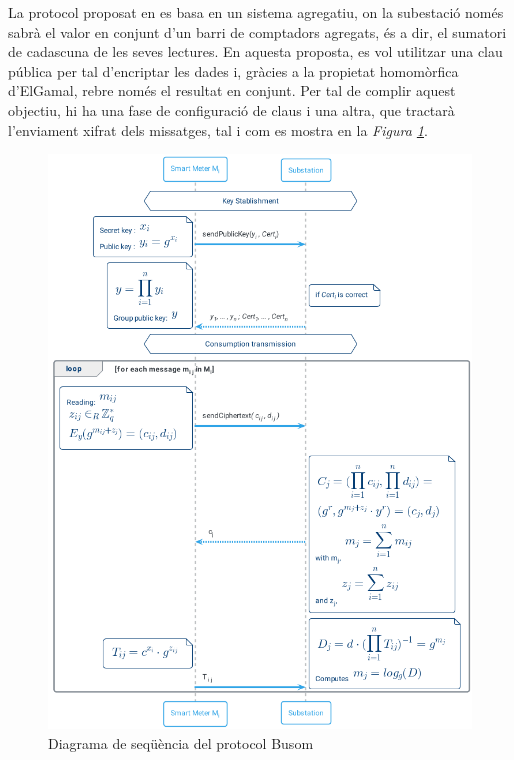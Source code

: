 

La protocol proposat en \cite{busom} es basa en un sistema agregatiu, on la subestació només sabrà el valor en conjunt d'un barri de comptadors agregats, és a dir, el sumatori de cadascuna de les seves lectures. En aquesta proposta, es vol utilitzar una clau pública per tal d'encriptar les dades i, gràcies a la propietat homomòrfica d'ElGamal, rebre només el resultat en conjunt. Per tal de complir aquest objectiu, hi ha una fase de configuració de claus i una altra, que tractarà l'enviament xifrat dels missatges, tal i com es mostra en la \textit{Figura \ref{fig:busom}}.
\begin{figure}
	\centering
	\includegraphics[width=14cm]{umls/busom.png}
	\caption{Diagrama de seqüència del protocol Busom}
	\label{fig:busom}
\end{figure}

